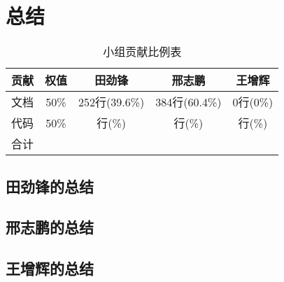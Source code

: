﻿\section{总结}

\begin{table}[htp]
\centering
\begin{tabular}{|c|c||c|c|c|}\hline
贡献 & 权值 & 田劲锋 & 邢志鹏 & 王增辉 \\\hline\hline
文档 & 50\% & 252行(39.6\%) & 384行(60.4\%) & 0行(0\%) \\
代码 & 50\% & 行(\%) & 行(\%) & 行(\%) \\
\hline
合计 & & & & \\\hline
\end{tabular}
\caption{\label{cons}小组贡献比例表}
\end{table}

\subsection{田劲锋的总结}


\subsection{邢志鹏的总结}


\subsection{王增辉的总结}


